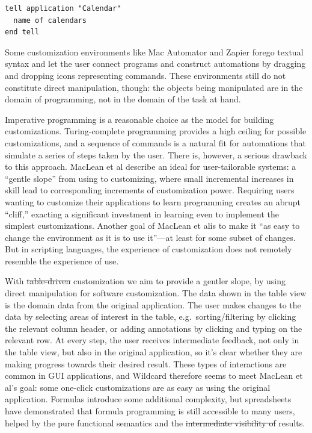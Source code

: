 \documentclass[sigplan,screen,10pt,anonymous,review]{acmart}
\providecommand{\DIFadd}[1]{{\protect\color{blue}\uwave{#1}}} %
\providecommand{\DIFdel}[1]{{\protect\color{red}\sout{#1}}}                      %
\providecommand{\DIFaddbegin}{} %
\providecommand{\DIFaddend}{} %
\providecommand{\DIFdelbegin}{} %
\providecommand{\DIFdelend}{} %
\begin{document}
\begin{verbatim}
tell application "Calendar"
  name of calendars
end tell
\end{verbatim}

Some customization environments like Mac Automator and Zapier forego
textual syntax and let the user connect programs and construct
automations by dragging and dropping icons representing commands. These
environments still do not constitute direct manipulation, though: the
objects being manipulated are in the domain of programming, not in the
domain of the task at hand.

Imperative programming is a reasonable choice as the model for building
customizations. Turing-complete programming provides a high ceiling for
possible customizations, and a sequence of commands is a natural fit for
automations that simulate a series of steps taken by the user. There is,
however, a serious drawback to this approach. MacLean et
al\DIFaddbegin \DIFadd{.~}\DIFaddend \citep{maclean1990} describe an ideal for user-tailorable systems: a
``gentle slope'' from using to customizing, where small incremental
increases in skill lead to corresponding increments of customization
power. Requiring users wanting to customize their applications to learn
programming creates an abrupt ``cliff,'' exacting a significant
investment in learning even to implement the simplest customizations.
Another goal of MacLean et al\DIFaddbegin \DIFadd{.~}\DIFaddend is to make it ``as easy to change the
environment as it is to use it''---at least for some subset of changes.
But in scripting languages, the experience of customization does not
remotely resemble the experience of use.

With \DIFdelbegin \DIFdel{table-driven }\DIFdelend \DIFaddbegin \DIFadd{data-driven }\DIFaddend customization we aim to provide a gentler slope, by
using direct manipulation for software customization. The data shown in
the table view is the domain data from the original application. The
user makes changes to the data by selecting areas of interest in the
table, e.g.~sorting/filtering by clicking the relevant column header, or
adding annotations by clicking and typing on the relevant row. At every
step, the user receives intermediate feedback, not only in the table
view, but also in the original application, so it's clear whether they
are making progress towards their desired result. These types of
interactions are common in GUI applications, and Wildcard therefore
seems to meet MacLean et al\DIFaddbegin \DIFadd{.}\DIFaddend 's goal: some one-click customizations are
as easy as using the original application. Formulas introduce some
additional complexity, but spreadsheets have demonstrated that formula
programming is still accessible to many users, helped by the pure
functional semantics and the \DIFdelbegin \DIFdel{intermediate visibility of }\DIFdelend \DIFaddbegin \DIFadd{visibility of intermediate }\DIFaddend results.
\end{document}
